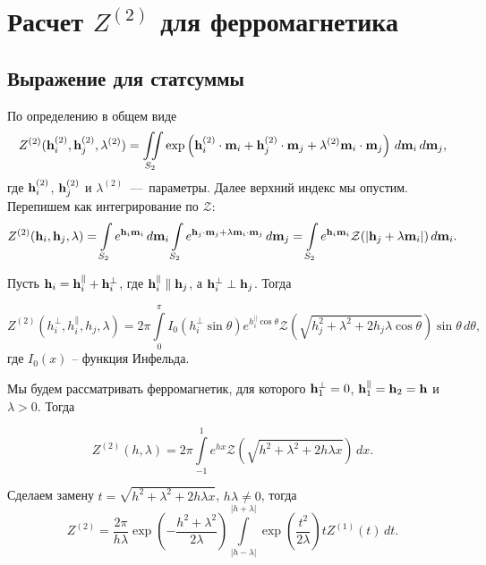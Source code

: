 \documentclass[12pt]{article}
\def\m{\mathbf m{}}
\def\h{{\bf h}}
\def\ZS{Z^{(1)}}
\def\ZV{Z^{(2)}}
\def\IS{\int\limits_{S_2}}
\def\IIS{\iint\limits_{S_2}}
\def\Z{{\mathcal Z}}
\begin{document}
\section*{Расчет $\ZV$ для ферромагнетика}
\subsection*{Выражение для статсуммы}

По определению в общем виде
\begin{equation}\label{Z2::def}
    \ZV (\h_i^{(2)}, \h_j^{(2)}, \lambda^{(2)}) = \IIS \exp\left(\h_i^{(2)}\cdot\m_i+\h_j^{(2)}\cdot\m_j+\lambda^{(2)}\m_i\cdot\m_j\right)\,d\m_i\,d\m_j,
\end{equation}
где $\h_i^{(2)}$, $\h_j^{(2)}$ и $\lambda^{(2)}$~---~параметры. Далее верхний индекс мы опустим. Перепишем как интегрирование по $\Z$:
\begin{equation}
    \ZV (\h_i, \h_j, \lambda) = \IS e^{\h_i\m_i}\,d\m_i \IS e^{\h_j\cdot\m_j+\lambda\m_i\cdot\m_j}\,d\m_j =  \IS e^{\h_i\m_i}\Z(\left| \h_j+\lambda\m_i \right|)\,d\m_i.
\end{equation}

Пусть $\h_i = \h_i^\parallel + \h_i^\perp$, где $\h_i^\parallel \parallel \h_j$, а $\h_i^\perp \perp \h_j$. Тогда

\begin{equation}\label{Z2::infeld}
    \ZV (h_i^\perp, h_i^\parallel, h_j, \lambda) = 2\pi\int\limits_0^\pi I_0(h_i^\perp \sin \theta) e^{h_i^\parallel\cos \theta} \Z\left(\sqrt{h_j^2+\lambda^2+2h_j\lambda\cos \theta}\right)\sin \theta\,d\theta,
\end{equation}
где $I_0(x)$ -- функция Инфельда. 

Мы будем рассматривать ферромагнетик, для которого $\h_1^\perp = 0$, $\h_1^\parallel = \h_2 = \h$ и $\lambda > 0$. Тогда
 
\begin{equation}
    \ZV (h, \lambda) = 2\pi\int\limits_{-1}^1 e^{hx} \Z\left( \sqrt{h^2+\lambda^2+2h\lambda x} \right)\,dx.
\end{equation}

Сделаем замену $t=\sqrt{h^2+\lambda^2+2h\lambda x}$, $h\lambda\neq0$, тогда
\begin{equation}
  \ZV = \frac{2\pi}{h\lambda} \exp\left(-\frac{h^2+\lambda^2}{2\lambda}\right) \int\limits_{|h-\lambda|}^{|h+\lambda|} \exp\left({\frac{t^2}{2\lambda}}\right)t\ZS(t)\,dt.
\end{equation}
\end{document}
